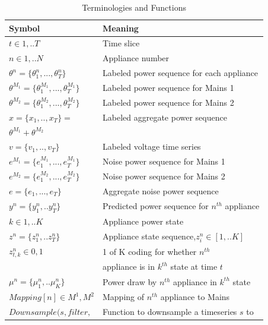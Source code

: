 \documentclass[conference]{IEEEtran}
\begin{document}
\begin{table}
\caption{Terminologies and Functions}
\label{tab:terms}
\begin{tabular}{|l|l|}
\hline
Symbol&Meaning\\
\hline
$t\in {1,..T}$& Time slice\\
$n\in{1,..N}$ & Appliance number\\
$\theta^n=\{\theta_1^n,...,\theta_T^n\}$ & Labeled power sequence for each appliance\\
$\theta^{M_1}=\{\theta_1^{M_1},...,\theta_T^{M_1}\}$ & Labeled power sequence for Mains 1\\
$\theta^{M_2}=\{\theta_1^{M_2},...,\theta_T^{M_2}\}$ & Labeled power sequence for Mains 2\\
$x=\{ x_1,..,x_T\}=$ & Labeled aggregate power sequence\\
$\theta^{M_1}+\theta^{M_2}$ &\\
$v=\{ v_1,..,v_T\}$ & Labeled voltage time series\\
$e^{M_1}=\{e_1^{M_1},...,e_T^{M_1}\}$ & Noise power sequence for Mains 1\\
$e^{M_2}=\{e_1^{M_2},...,e_T^{M_2}\}$ & Noise power sequence for Mains 2\\
$e=\{e_1,...,e_T\}$ & Aggregate noise power sequence\\
$y^n=\{y_1^n,..y_T^n\}$ & Predicted power sequence for $n^{th}$ appliance\\
$k\in {1,..K}$ & Appliance power state\\
$z^n=\{z_1^n,..z_T^n\}$ & Appliance state sequence,$z_i^n \in [1,..K]$\\
$z_{t,k}^n \in{0,1}$ & 1 of K coding for whether $n^{th}$ \\
&appliance is in $k^{th}$ state at time $t$\\
$\mu^n=\{\mu_1^n,..\mu_K^n\}$ & Power draw by $n^{th}$ appliance in $k^{th}$ state\\
$Mapping[n] \in {M^1,M^2}$ & Mapping of $n^{th}$ appliance to Mains\\
\hline
\hline
$Downsample(s,filter,$ & Function to downsample a timeseries $s$ to\\

\end{tabular}
\end{table}
\end{document}

